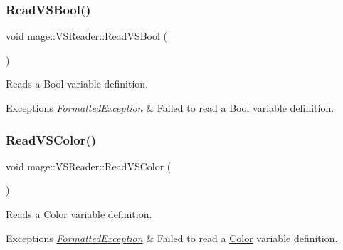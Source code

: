 \hypertarget{classmage_1_1_v_s_reader_a579233b81762c064739a29ba1c140898}{}\label{classmage_1_1_v_s_reader_a579233b81762c064739a29ba1c140898} 
\subsubsection{\texorpdfstring{Read\+V\+S\+Bool()}{ReadVSBool()}}
{\footnotesize\ttfamily void mage\+::\+V\+S\+Reader\+::\+Read\+V\+S\+Bool (\begin{DoxyParamCaption}{ }\end{DoxyParamCaption})\hspace{0.3cm}{\ttfamily [private]}}

Reads a Bool variable definition.


\begin{DoxyExceptions}{Exceptions}
{\em \hyperlink{structmage_1_1_formatted_exception}{Formatted\+Exception}} & Failed to read a Bool variable definition. \\
\hline
\end{DoxyExceptions}
\hypertarget{classmage_1_1_v_s_reader_a42bdfc1fcc6f385e0f88820491d53e04}{}\label{classmage_1_1_v_s_reader_a42bdfc1fcc6f385e0f88820491d53e04} 
\subsubsection{\texorpdfstring{Read\+V\+S\+Color()}{ReadVSColor()}}
{\footnotesize\ttfamily void mage\+::\+V\+S\+Reader\+::\+Read\+V\+S\+Color (\begin{DoxyParamCaption}{ }\end{DoxyParamCaption})\hspace{0.3cm}{\ttfamily [private]}}

Reads a \hyperlink{structmage_1_1_color}{Color} variable definition.


\begin{DoxyExceptions}{Exceptions}
{\em \hyperlink{structmage_1_1_formatted_exception}{Formatted\+Exception}} & Failed to read a \hyperlink{structmage_1_1_color}{Color} variable definition. \\
\hline
\end{DoxyExceptions}
\hypertarget{classmage_1_1_v_s_reader_a64c525d3d87ed248424e4eba359d9ecf}{}\label{classmage_1_1_v_s_reader_a64c525d3d87ed248424e4eba359d9ecf} 

